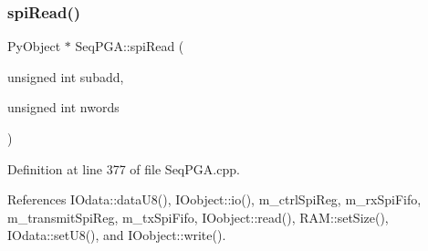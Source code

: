 \subsubsection{\texorpdfstring{spi\+Read()}{spiRead()}\hspace{0.1cm}{\footnotesize\ttfamily [2/3]}}
{\footnotesize\ttfamily Py\+Object $\ast$ Seq\+P\+G\+A\+::spi\+Read (\begin{DoxyParamCaption}\item[{unsigned int}]{subadd,  }\item[{unsigned int}]{nwords }\end{DoxyParamCaption})}



Definition at line 377 of file Seq\+P\+G\+A.\+cpp.



References I\+Odata\+::data\+U8(), I\+Oobject\+::io(), m\+\_\+ctrl\+Spi\+Reg, m\+\_\+rx\+Spi\+Fifo, m\+\_\+transmit\+Spi\+Reg, m\+\_\+tx\+Spi\+Fifo, I\+Oobject\+::read(), R\+A\+M\+::set\+Size(), I\+Odata\+::set\+U8(), and I\+Oobject\+::write().


